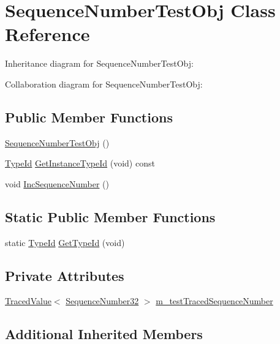\hypertarget{classSequenceNumberTestObj}{}\section{Sequence\+Number\+Test\+Obj Class Reference}
\label{classSequenceNumberTestObj}


Inheritance diagram for Sequence\+Number\+Test\+Obj\+:


Collaboration diagram for Sequence\+Number\+Test\+Obj\+:
\subsection*{Public Member Functions}
\begin{DoxyCompactItemize}
\item 
\hyperlink{classSequenceNumberTestObj_a5ddff81d35e07af644f6405a4a0dafb7}{Sequence\+Number\+Test\+Obj} ()
\item 
\hyperlink{classns3_1_1TypeId}{Type\+Id} \hyperlink{classSequenceNumberTestObj_a6bd56da09be46a5d18eab857bac7dbd4}{Get\+Instance\+Type\+Id} (void) const 
\item 
void \hyperlink{classSequenceNumberTestObj_ab73ddeb704f097e2965feb39b040d6b4}{Inc\+Sequence\+Number} ()
\end{DoxyCompactItemize}
\subsection*{Static Public Member Functions}
\begin{DoxyCompactItemize}
\item 
static \hyperlink{classns3_1_1TypeId}{Type\+Id} \hyperlink{classSequenceNumberTestObj_af879e9bdce24723847b6098d9d6c775e}{Get\+Type\+Id} (void)
\end{DoxyCompactItemize}
\subsection*{Private Attributes}
\begin{DoxyCompactItemize}
\item 
\hyperlink{classns3_1_1TracedValue}{Traced\+Value}$<$ \hyperlink{group__network_gacb2070e4e98d2d5135c9bede58f07a03}{Sequence\+Number32} $>$ \hyperlink{classSequenceNumberTestObj_afeb2e75eb26ec5f42365a5015743d870}{m\+\_\+test\+Traced\+Sequence\+Number}
\end{DoxyCompactItemize}
\subsection*{Additional Inherited Members}


